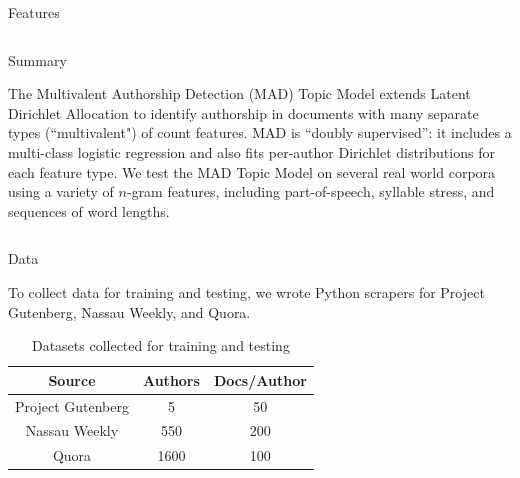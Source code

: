 \documentclass[final]{beamer}
\newlength{\onecolwid}
\newlength{\twocolwid}
\begin{document}
\begin{frame}[t]
\begin{columns}[t]
\begin{column}{\twocolwid}
\begin{columns}[t,totalwidth=\twocolwid]
\begin{column}{\onecolwid}
\begin{block}{Features}
\end{block}


\end{column} %

\end{columns} %


\begin{alertblock}{Summary}

The Multivalent Authorship Detection (MAD) Topic Model extends Latent Dirichlet Allocation to identify authorship in documents with many separate types (``multivalent") of count features. MAD is ``doubly supervised'': it includes a multi-class logistic regression and also fits per-author Dirichlet distributions for each feature type. We test the MAD Topic Model on several real world corpora using a variety of $n$-gram features, including part-of-speech, syllable stress, and sequences of word lengths.
\end{alertblock} 


\begin{columns}[t,totalwidth=\twocolwid] %

\begin{column}{\onecolwid} %


\begin{block}{Data}

To collect data for training and testing, we wrote Python scrapers for Project Gutenberg, Nassau Weekly, and Quora. 

\vspace{5 mm}

\begin{table}[ht] 
\caption{Datasets collected for training and testing}
\centering
\begin{tabular}{ c | c | c }
  Source & Authors & Docs/Author \\
  \hline
  Project Gutenberg & 5 & 50 \\
  Nassau Weekly & 550 & 200 \\
  Quora & 1600 & 100 \\
\end{tabular}
\end{table}


\end{block}
\end{column}
\end{columns}
\end{column}
\end{columns}
\end{frame}
\end{document}
